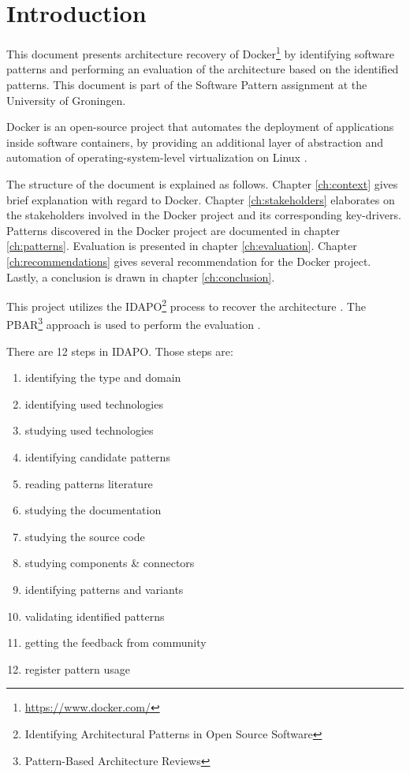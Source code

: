 \clearpage
\chapter{Introduction}
\label{ch:introduction}
This document presents architecture recovery of
Docker\footnote{\url{https://www.docker.com/}} by identifying software patterns
and performing an evaluation of the architecture based on the identified
patterns. This document is part of the Software Pattern assignment at the
University of Groningen.

Docker is an open-source project that automates the deployment of applications
inside software containers, by providing an additional layer of abstraction and
automation of operating-system-level virtualization on Linux \cite{dockerdef}.

The structure of the document is explained as follows. Chapter \ref{ch:context}
gives brief explanation with regard to Docker. Chapter \ref{ch:stakeholders}
elaborates on the stakeholders involved in the Docker project and its
corresponding key-drivers. Patterns discovered in the Docker project are
documented in chapter \ref{ch:patterns}. Evaluation is presented in chapter
\ref{ch:evaluation}. Chapter \ref{ch:recommendations} gives several
recommendation for the Docker project. Lastly, a conclusion is drawn in chapter
\ref{ch:conclusion}.

This project utilizes the IDAPO\footnote{Identifying Architectural Patterns in
Open Source Software} process to recover the architecture \cite{idapo}. The
PBAR\footnote{Pattern-Based Architecture Reviews} approach is used to perform
the evaluation \cite{pbar}.

There are 12 steps in IDAPO. Those steps are:
\begin{enumerate}
\item identifying the type and domain
\item identifying used technologies
\item studying used technologies
\item identifying candidate patterns
\item reading patterns literature
\item studying the documentation
\item studying the source code
\item studying components \& connectors
\item identifying patterns and variants
\item validating identified patterns
\item getting the feedback from community
\item register pattern usage
\end{enumerate}

